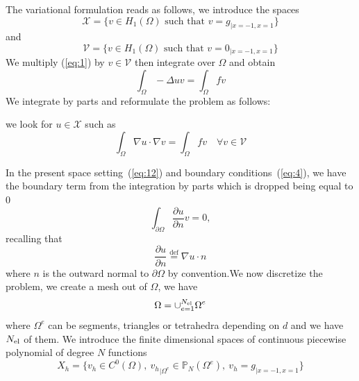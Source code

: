 \noindent
The variational formulation reads as follows, we introduce the spaces
\begin{equation}
  \label{eq:11}
  \mathcal{X} = \Big\{ v \in H_1(\Omega) \text{ such that } v=g_{|x=-1,x=1} \Big\}
\end{equation}
and
\begin{equation}
  \label{eq:12}
  \mathcal{V} = \Big\{ v \in H_1(\Omega) \text{ such that } v=0_{|x=-1,x=1} \Big\}
\end{equation}
We multiply (\ref{eq:1}) by $v \in \mathcal{V}$ then integrate over $\Omega$ and obtain
\begin{equation}
  \label{eq:13}
  \int_\Omega -\Delta u v = \int_\Omega f v
\end{equation}
We integrate by parts and reformulate the problem as follows:
\begin{problem}
we look
for $u \in \mathcal{X}$ such as%
\begin{equation}
  \label{eq:14}
  \int_\Omega \nabla u \cdot \nabla v  = \int_\Omega f v \quad \forall v \in \mathcal{V}
\end{equation}

\end{problem}
In the present space setting~(\ref{eq:12}) and boundary
conditions~(\ref{eq:4}), we have the boundary term from the integration by
parts which is dropped being equal to 0
\begin{equation}
  \label{eq:15}
  \int_{\partial \Omega} \frac{\partial u}{\partial n} v = 0,
\end{equation}
recalling that
\begin{equation}
  \label{eq:21}
  \frac{\partial u}{\partial n} \stackrel{\text{def}}{=} \nabla u \cdot n
\end{equation}
where $n$ is the outward normal to $\partial \Omega$ by convention.We
now discretize the problem, we create a mesh out of $\Omega$, we have
\begin{equation}
  \label{eq:10}
  \displaystyle{\Omega = \cup_{e=1}^\nel \Omega^e}
\end{equation}
where $\Omega^e$ can be segments, triangles or tetrahedra depending on
$d$ and we have ${N_{\text{el}}}$ of them. We introduce the finite dimensional
spaces of continuous piecewise polynomial of degree $N$ functions
\begin{equation}
  \label{eq:17}
  X_h = \Big\{ v_h  \in C^0(\Omega),\ {v_h}_{|\Omega^e} \in \mathbb{P}_N( \Omega^e ),\   v_h=g_{|x=-1,x=1}\Big\}
\end{equation}
